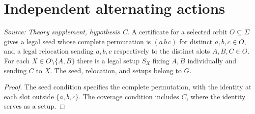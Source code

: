 \section{Independent alternating actions}

\begin{definition}
  \label{def:pure-controller}
  \leanok
  \textit{Source: Theory supplement, hypothesis C.}
  A certificate for a selected orbit \(O\subseteq\Sigma\) gives a legal
  seed whose complete permutation is \((a\,b\,c)\) for distinct
  \(a,b,c\in O\), and a legal relocation sending \(a,b,c\) respectively
  to the distinct slots \(A,B,C\in O\). For each \(X\in O\setminus\{A,B\}\)
  there is a legal setup \(S_X\) fixing \(A,B\) individually and sending
  \(C\) to \(X\). The seed, relocation, and setups belong to \(G\).
\end{definition}
\begin{proof}
  \leanok
  The seed condition specifies the complete permutation, with the
  identity at each slot outside \(\{a,b,c\}\). The coverage condition
  includes \(C\), where the identity serves as a setup.
\end{proof}

